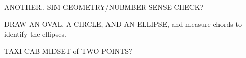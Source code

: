 \documentclass[noauthor,nooutcomes]{ximera}
\author{Bart Snapp}
\begin{document}
\maketitle


ANOTHER.. SIM GEOMETRY/NUBMBER SENSE CHECK?

DRAW AN OVAL, A CIRCLE, AND AN ELLIPSE, and measure chords to identify the ellipses.

TAXI CAB MIDSET of TWO POINTS?
\end{document}
